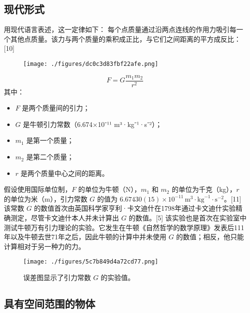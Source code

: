 \subsection{现代形式}
用现代语言表述，这一定律如下：
每个点质量通过沿两点连线的作用力吸引每一个其他点质量。该力与两个质量的乘积成正比，与它们之间距离的平方成反比：[10] 
\begin{figure}[ht]
\centering
\texttt{[image: ./figures/dc0c3d83fbf22afe.png]}
\caption{} \label{fig_NEWW_1}
\end{figure}
\[
F = G \frac{m_1 m_2}{r^2}~
\]
其中：
\begin{itemize}
\item \( F \) 是两个质量间的引力；
\item \( G \) 是牛顿引力常数（6.674×10⁻¹¹ m³·kg⁻¹·s⁻²）；
\item \( m_1 \) 是第一个质量；
\item \( m_2 \) 是第二个质量；
\item \( r \) 是两个质量中心之间的距离。
\end{itemize}
假设使用国际单位制，\( F \) 的单位为牛顿（N），\( m_1 \) 和 \( m_2 \) 的单位为千克（kg），\( r \) 的单位为米（m），引力常数 \( G \) 的值为 \( 6.67430(15) \times 10^{-11} \, \text{m}^3 \cdot \text{kg}^{-1} \cdot \text{s}^{-2} \)。[11] 该常数 \( G \) 的数值首次由英国科学家亨利·卡文迪什在1798年通过卡文迪什实验精确测定，尽管卡文迪什本人并未计算出 \( G \) 的数值。[5] 该实验也是首次在实验室中测试牛顿万有引力理论的实验。它发生在牛顿《自然哲学的数学原理》发表后111年以及牛顿去世71年之后，因此牛顿的计算中并未使用 \( G \) 的数值；相反，他只能计算相对于另一种力的力。
\begin{figure}[ht]
\centering
\texttt{[image: ./figures/5c7b849d4a72cd77.png]}
\caption{误差图显示了引力常数 \( G \) 的实验值。} \label{fig_NEWW_2}
\end{figure}
\subsection{具有空间范围的物体}
